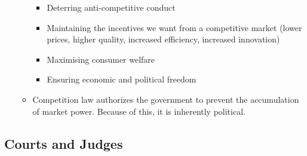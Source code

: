 \documentclass[11pt]{article}
\begin{document}
\begin{itemize}
\begin{itemize}
\begin{itemize}
\item Deterring anti-competitive conduct
\item Maintaining the incentives we want from a competitive market (lower
prices, higher quality, increased efficiency, increased innovation)
\item Maximising consumer welfare
\item Ensuring economic and political freedom
\end{itemize}
\item Competition law authorizes the government to prevent the accumulation of
market power. Because of this, it is inherently political.
\end{itemize}
\end{itemize}
\subsection{Courts and Judges}
\label{sec:orgaced085}
\end{document}
